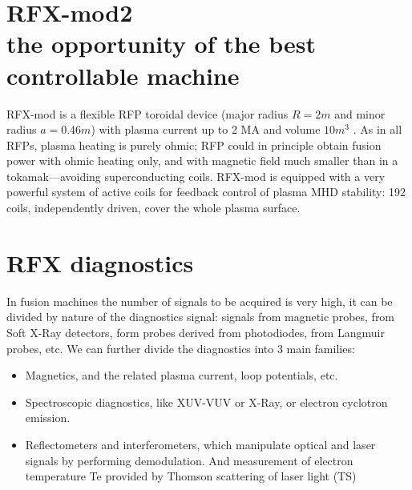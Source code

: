 
\section{RFX-mod2 \\ \small{the opportunity of the best controllable machine}}
\cite{SONATO2003161}
\cite{doi:10.1063/1.4806765}
\cite{martin_RFX_overview}


RFX-mod is a flexible \ac{RFP} toroidal device (major radius $R=2 m$ and minor radius $a=0.46 m$) with plasma current up to 2 MA and volume $10 m^3$ \cite{SONATO200597}. As in all RFPs, plasma heating is purely ohmic; \acl{RFP} could in principle obtain fusion power with ohmic heating only, and with magnetic field much smaller than in a tokamak—avoiding superconducting coils. RFX-mod is equipped with a very powerful system of active coils for feedback control of plasma MHD stability: 192 coils, independently driven, cover the whole plasma surface.


\section{RFX diagnostics}
In fusion machines the number of signals to be acquired is very high, it can be divided by nature of the diagnostics signal:
signals from magnetic probes, from Soft X-Ray detectors, form probes derived from photodiodes, from Langmuir probes, etc.
%
We can further divide the diagnostics into 3 main families:
\begin{itemize}
    \item Magnetics, and the related plasma current, loop potentials, etc.
    \item Spectroscopic diagnostics, like XUV-VUV or X-Ray, or electron cyclotron emission. 
    \item Reflectometers and interferometers, which manipulate optical and laser signals by performing demodulation.    
          And measurement of electron temperature Te provided by Thomson scattering of laser light (TS)
\end{itemize}


